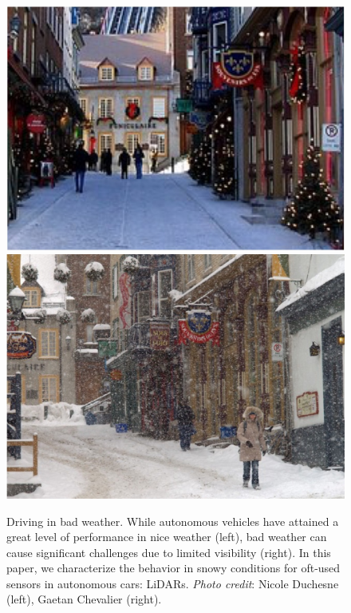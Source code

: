 \begin{figure}
\includegraphics[width=.48\linewidth]{./img/teaser/summer.jpg}
\includegraphics[width=.48\linewidth]{./img/teaser/winter.jpg}
\caption{Driving in bad weather. While autonomous vehicles have attained a great level of performance in nice weather (left), bad weather can cause significant challenges due to limited visibility (right). In this paper, we characterize the behavior in snowy conditions for oft-used sensors in autonomous cars: LiDARs. \emph{Photo credit}: Nicole Duchesne (left), Gaetan Chevalier (right).}
\label{fig:good-bad-weather}
\end{figure}





